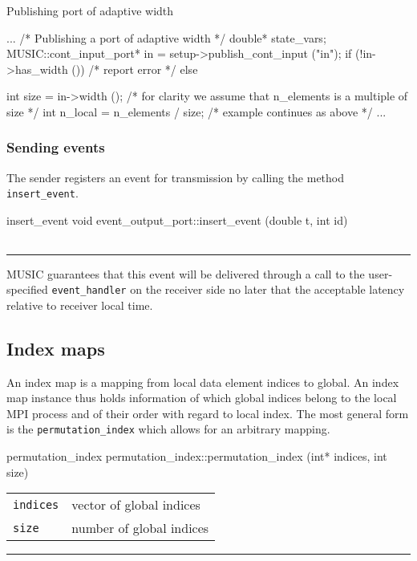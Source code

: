 \documentclass[a4paper]{report}
\makeatletter
\newenvironment{parameters}%
{\begin{tabular}{@{\hspace{2em}}lp{0.6\textwidth}}}%
{\end{tabular}\par\vspace{1mm}\par\hrule\par\vspace{5mm}}
\makeatother
\begin{document}
\begin{code}{Publishing port of adaptive width\label{code:adaptivewidth}}
{
  ...
  /* Publishing a port of adaptive width */
  double* state_vars;
  MUSIC::cont_input_port* in = setup->publish_cont_input ("in");
  if (!in->has_width ())
    /* report error */
  else
    {
      int size = in->width ();
      /* for clarity we assume that n_elements is a multiple of size */
      int n_local = n_elements / size;
      /* example continues as above */
      ...
      
    }
}
\end{code}

\subsubsection{Sending events}

The sender registers an event for transmission by calling the method
\lstinline|insert_event|.

\begin{head}{insert_event}
  void event_output_port::insert_event (double t, int id)
\end{head}
\begin{parameters}
\end{parameters}

MUSIC guarantees that this event will be delivered through a call to
the user-specified \lstinline|event_handler| on the receiver side no
later that the acceptable latency relative to receiver local time.

\subsection{Index maps}

An index map is a mapping from local data element indices to
global. An index map instance thus holds information of which global
indices belong to the local MPI process and of their order with regard
to local index.  The most general form is the
\lstinline|permutation_index| which allows for an arbitrary mapping.

\begin{head}{permutation_index}
  permutation_index::permutation_index (int* indices,
                                        int size)
\end{head}
\begin{parameters}
  \lstinline|indices| & vector of global indices \\
  \lstinline|size| & number of global indices \\
\end{parameters}
\end{document}
